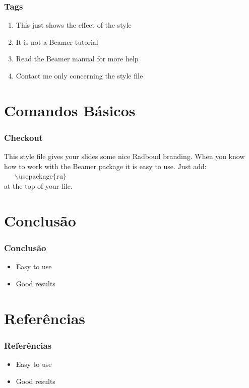 \documentclass{beamer}
\begin{document}
\begin{frame}
    \frametitle{Tags}

    \begin{enumerate}
        \item This just shows the effect of the style
        \item It is not a Beamer tutorial
        \item Read the Beamer manual for more help
        \item Contact me only concerning the style file
    \end{enumerate}
\end{frame}

\section{Comandos B\'asicos}

\begin{frame}
    \frametitle{Checkout}

    This style file gives your slides some nice Radboud branding.
    When you know how to work with the Beamer package it is easy to use.
    Just add:\\ ~~~$\backslash$usepackage$\{$ru$\}$ \\ at the top of your file.
\end{frame}

\section{Conclus\~ao}

\begin{frame}
    \frametitle{Conclus\~ao}

    \begin{itemize}
        \item Easy to use
        \item Good results
    \end{itemize}
\end{frame}

\section{Refer\^encias}
\begin{frame}
    \frametitle{Refer\^encias}

    \begin{itemize}
        \item Easy to use
        \item Good results
    \end{itemize}
\end{frame}
\end{document}
